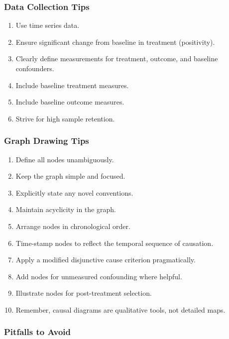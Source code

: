 \documentclass[
  singlecolumn]{article}
\providecommand{\tightlist}{%
  \setlength{\itemsep}{0pt}\setlength{\parskip}{0pt}}\usepackage{longtable,booktabs,array}
\begin{document}
\subsubsection{Data Collection Tips}\label{data-collection-tips}

\begin{enumerate}
\def\labelenumi{\arabic{enumi}.}
\tightlist
\item
  Use time series data.
\item
  Ensure significant change from baseline in treatment (positivity).
\item
  Clearly define measurements for treatment, outcome, and baseline
  confounders.
\item
  Include baseline treatment measures.
\item
  Include baseline outcome measures.
\item
  Strive for high sample retention.
\end{enumerate}

\subsubsection{Graph Drawing Tips}\label{graph-drawing-tips}

\begin{enumerate}
\def\labelenumi{\arabic{enumi}.}
\tightlist
\item
  Define all nodes unambiguously.
\item
  Keep the graph simple and focused.
\item
  Explicitly state any novel conventions.
\item
  Maintain acyclicity in the graph.
\item
  Arrange nodes in chronological order.
\item
  Time-stamp nodes to reflect the temporal sequence of causation.
\item
  Apply a modified disjunctive cause criterion pragmatically.
\item
  Add nodes for unmeasured confounding where helpful.
\item
  Illustrate nodes for post-treatment selection.
\item
  Remember, causal diagrams are qualitative tools, not detailed maps.
\end{enumerate}

\subsubsection{Pitfalls to Avoid}\label{pitfalls-to-avoid}
\end{document}
